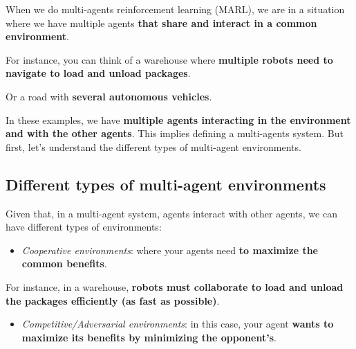 \documentclass[11pt,a4paper]{article}
\begin{document}
When we do multi-agents reinforcement learning (MARL), we are in a situation where we have multiple agents \textbf{that share and interact in a common environment}.

For instance, you can think of a warehouse where \textbf{multiple robots need to navigate to load and unload packages}.


Or a road with \textbf{several autonomous vehicles}.


In these examples, we have \textbf{multiple agents interacting in the environment and with the other agents}. This implies defining a multi-agents system. But first, let's understand the different types of multi-agent environments.

\subsection{Different types of multi-agent environments}\label{different-types-of-multi-agent-environments}

Given that, in a multi-agent system, agents interact with other agents, we can have different types of environments:

\begin{itemize}
\tightlist
\item
  \emph{Cooperative environments}: where your agents need \textbf{to maximize the common benefits}.
\end{itemize}

For instance, in a warehouse, \textbf{robots must collaborate to load and unload the packages efficiently (as fast as possible)}.

\begin{itemize}
\tightlist
\item
  \emph{Competitive/Adversarial environments}: in this case, your agent \textbf{wants to maximize its benefits by minimizing the opponent's}.
\end{itemize}
\end{document}
